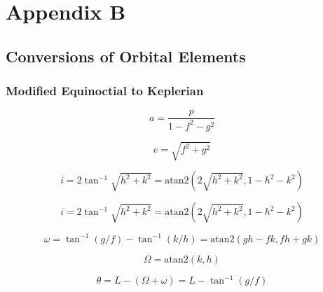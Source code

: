 \newpage\section*{Appendix B}

\subsection*{Conversions of Orbital Elements}

\subsubsection*{Modified Equinoctial to Keplerian\label{mee2kep}}

\begin{equation}
    a = \frac{p}{1-f^2-g^2}
\end{equation}

\begin{equation}
    e = \sqrt{f^2 + g^2}
\end{equation}

\begin{equation}
    i = 2\tan^{-1}{\sqrt{h^2+k^2}}=\textrm{atan2}(2\sqrt{h^2+k^2},1-h^2-k^2)
\end{equation}

\begin{equation}
    i = 2\tan^{-1}{\sqrt{h^2+k^2}}=\textrm{atan2}(2\sqrt{h^2+k^2},1-h^2-k^2)
\end{equation}

\begin{equation}
    \omega=\tan^{-1}(g/f)-\tan^{-1}(k/h)=\textrm{atan2}(gh-fk, fh+gk)
\end{equation}

\begin{equation}
    \Omega=\textrm{atan2}(k, h)
\end{equation}

\begin{equation}
    \theta = L-(\Omega+\omega)=L-\tan^{-1}(g/f)
\end{equation}

